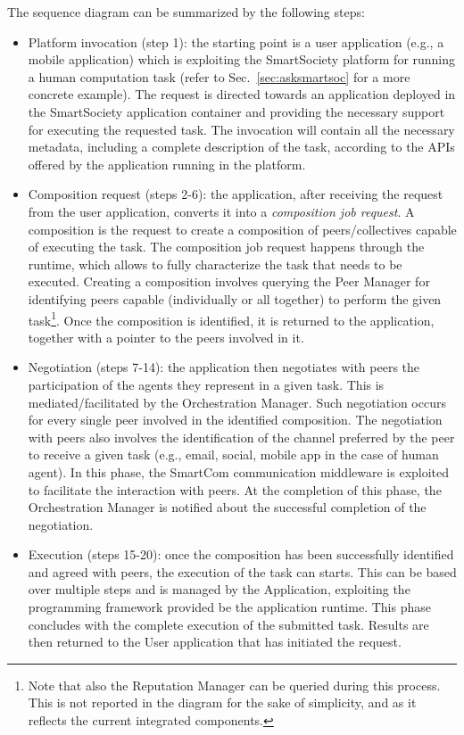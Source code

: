The sequence diagram can be summarized by the following steps:
\begin{itemize}
\item Platform invocation (step 1): the starting point is a user application (e.g., a mobile application) which is exploiting the SmartSociety platform for running a human computation task (refer to Sec.~\ref{sec:asksmartsoc} for a more concrete example). The request is directed towards an application deployed in the SmartSociety application container and providing the necessary support for executing the requested task. The invocation will contain all the necessary metadata, including a complete description of the task, according to the APIs offered by the application running in the platform.

\item Composition request (steps 2-6): the application, after receiving the request from the user application, converts it into a \textit{composition job request}. A composition is the request to create a composition of peers/collectives capable of executing the task. The composition job request happens through %
the runtime, which allows to fully characterize the task that needs to be executed. Creating a composition involves querying the Peer Manager for identifying peers capable (individually or all together) to perform the given task\footnote{Note that also the Reputation Manager can be queried during this process. This is not reported in the diagram for the sake of simplicity, and as it reflects the current integrated components.}. Once the composition is identified, it is returned to the application, together with a pointer to the peers involved in it.

\item  Negotiation (steps 7-14): the application then negotiates with peers the participation of the agents they represent in a given task. This is mediated/facilitated by the Orchestration Manager. Such negotiation occurs for every single peer involved in the identified composition. The negotiation with peers also involves the identification of the channel preferred by the peer to receive a given task (e.g., email, social, mobile app in the case of human agent). In this phase, the SmartCom communication middleware is exploited to facilitate the interaction with peers. At the completion of this phase, the Orchestration Manager is notified about the successful completion of the negotiation.

\item Execution (steps 15-20): once the composition has been successfully identified and agreed with peers, the execution of the task can starts. This can be based over multiple steps and is managed by the Application, exploiting the programming framework provided be the application runtime. This phase concludes with the complete execution of the submitted task. Results are then returned to the User application that has initiated the request.

\end{itemize}


